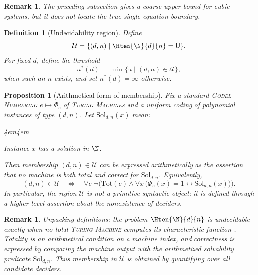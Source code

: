 \documentclass[letterpaper,10pt]{article}
\theoremstyle{upright}
\theoremstyle{upright}
\newtheorem{remark}[theorem]{Remark}
\newtheorem{definition}[theorem]{Definition}
\newtheorem{proposition}[theorem]{Proposition}
\renewenvironment{quotation}
{\small\vspace{0.5em}\begin{adjustwidth}{4em}{4em}%

		\setlength{\parindent}{0pt}%
		\setlength{\parskip}{\medskipamount}%
	}
	{\end{adjustwidth}\vspace{1em}}
\begin{document}
\begin{remark}
	The preceding subsection gives a coarse upper bound for cubic systems, but it does not locate the true single-equation boundary.
\end{remark}

\begin{definition}[Undecidability region]
\label{def:undecidability-region}
	Define
	\begin{equation}
		\mathcal{U} = \{(d,n)\mid \Hten{\N}{d}{n}=\mathsf{U}\}.
	\end{equation}
	For fixed $d$, define the threshold
	\begin{equation}
		n^*(d) = \min\{n\mid (d,n)\in\mathcal{U}\},
	\end{equation}
	when such an $n$ exists, and set $n^*(d)=\infty$ otherwise.
\end{definition}

\begin{proposition}[Arithmetical form of membership]
\label{prop:region-arithmetical-form}
	Fix a standard \textsc{Gödel Numbering} $e\mapsto\Phi_e$ of \textsc{Turing Machines} \citep{rogers67,kleene52}
	and a uniform coding of polynomial instances of type $(d,n)$. Let
	$\mathrm{Sol}_{d,n}(x)$ mean:
	\begin{quotation}
		\centering Instance $x$ has a solution in $\N$.
	\end{quotation}
	Then membership $(d,n)\in\mathcal{U}$ can be expressed arithmetically as the assertion that no machine is both total and correct for $\mathrm{Sol}_{d,n}$.
	Equivalently,
	\begin{equation}
		(d,n)\in\mathcal{U}
		\quad\Longleftrightarrow\quad
		\forall e\;
		\neg
		\Big(
			\mathrm{Tot}(e)
			\wedge
			\forall x\,
			\big(\Phi_e(x)=1\leftrightarrow \mathrm{Sol}_{d,n}(x)\big)
		\Big).
	\end{equation}
	In particular, the region $\mathcal{U}$ is not a primitive syntactic object; it is defined through a higher-level assertion about the nonexistence of deciders.
\end{proposition}

\begin{remark}
	Unpacking definitions: the problem $\Hten{\N}{d}{n}$ is undecidable exactly when no total \textsc{Turing Machine} computes its characteristic function \citep{turing37,turing38}. Totality is an arithmetical condition on a machine index, and correctness is expressed by comparing the machine output with the arithmetized solvability predicate $\mathrm{Sol}_{d,n}$. Thus membership in $\mathcal{U}$ is obtained by quantifying over all candidate deciders.
\end{remark}
\end{document}
